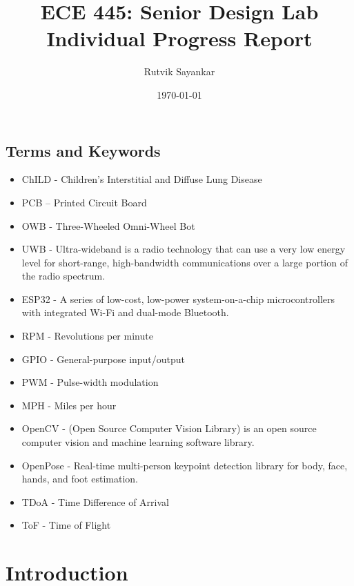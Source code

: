 \documentclass{report}
\title{ECE 445: Senior Design Lab \\ Individual Progress Report} %
\author{Rutvik Sayankar} %
\date{\today} %
\begin{document}
    \maketitle %
    
    \pagebreak
    \tableofcontents %
    \pagebreak

    \section{Terms and Keywords}
    \vspace{0.8cm}
    \begin{itemize}
        \item ChILD - Children's Interstitial and Diffuse Lung Disease
        \item PCB – Printed Circuit Board
        \item OWB - Three-Wheeled Omni-Wheel Bot
        \item UWB - Ultra-wideband is a radio technology that can use a very low energy level for short-range, high-bandwidth communications over a large portion of the radio spectrum.
        \item ESP32 - A series of low-cost, low-power system-on-a-chip microcontrollers with integrated Wi-Fi and dual-mode Bluetooth.
        \item RPM - Revolutions per minute
        \item GPIO - General-purpose input/output
        \item PWM - Pulse-width modulation
        \item MPH - Miles per hour
        \item OpenCV - (Open Source Computer Vision Library) is an open source computer vision and machine learning software library.
        \item OpenPose - Real-time multi-person keypoint detection library for body, face, hands, and foot estimation.
        \item TDoA - Time Difference of Arrival 
        \item ToF - Time of Flight
    \end{itemize}

    \pagebreak

    \chapter{Introduction}
\end{document}
